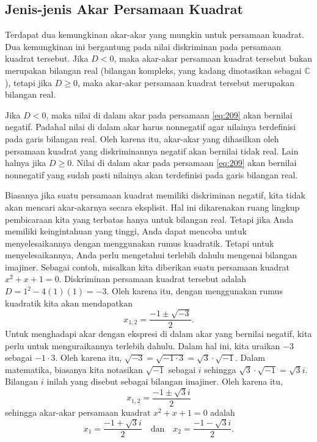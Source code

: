 \subsection{Jenis-jenis Akar Persamaan Kuadrat}

	Terdapat dua kemungkinan akar-akar yang mungkin untuk persamaan kuadrat. Dua kemungkinan ini bergantung pada nilai diskriminan pada persamaan kuadrat tersebut. Jika $ D < 0 $, maka akar-akar persamaan kuadrat tersebut bukan merupakan bilangan real (bilangan kompleks, yang kadang dinotasikan sebagai $ \mathbb{C} $), tetapi jika $ D \geq 0 $, maka akar-akar persamaan kuadrat tersebut merupakan bilangan real.
	
	\par Jika $ D < 0 $, maka nilai di dalam akar pada persamaan \ref{eq:209} akan bernilai negatif. Padahal nilai di dalam akar harus nonnegatif agar nilainya terdefinisi pada garis bilangan real. Oleh karena itu, akar-akar yang dihasilkan oleh persamaan kuadrat yang diskriminannya negatif akan bernilai tidak real. Lain halnya jika $ D \geq 0 $. Nilai di dalam akar pada persamaan \ref{eq:209} akan bernilai nonnegatif yang sudah pasti nilainya akan terdefinisi pada garis bilangan real.
	
	\par Biasanya jika suatu persamaan kuadrat memiliki diskriminan negatif, kita tidak akan mencari akar-akarnya secara eksplisit. Hal ini dikarenakan ruang lingkup pembicaraan kita yang terbatas hanya untuk bilangan real. Tetapi jika Anda memiliki keingintahuan yang tinggi, Anda dapat mencoba untuk menyelesaikannya dengan menggunakan rumus kuadratik. Tetapi untuk menyelesaikannya, Anda perlu mengetahui terlebih dahulu mengenai bilangan imajiner. Sebagai contoh, misalkan kita diberikan suatu persamaan kuadrat $ x^{2} + x + 1 = 0 $. Diskriminan persamaan kuadrat tersebut adalah $ D = 1^{2} - 4\left(1\right)\left(1\right) = -3 $. Oleh karena itu, dengan menggunakan rumus kuadratik kita akan mendapatkan
	\[ x_{1, 2} = \frac{-1 \pm \sqrt{-3}}{2}. \]
	Untuk menghadapi akar dengan ekspresi di dalam akar yang bernilai negatif, kita perlu untuk menguraikannya terlebih dahulu. Dalam hal ini, kita uraikan $ -3 $ sebagai $ -1 \cdot 3 $. Oleh karena itu, $ \sqrt{-3} = \sqrt{-1 \cdot 3} = \sqrt{3} \cdot \sqrt{-1} $. Dalam matematika, biasanya kita notasikan $ \sqrt{-1} $ sebagai $ i $ sehingga $ \sqrt{3} \cdot \sqrt{-1} = \sqrt{3}i $. Bilangan $ i $ inilah yang disebut sebagai bilangan imajiner. Oleh karena itu,
	\[ x_{1, 2} = \frac{-1 \pm \sqrt{3}i}{2} \]
	sehingga akar-akar persamaan kuadrat $ x^{2} + x + 1 = 0 $ adalah
	\[ x_{1} = \frac{-1 + \sqrt{3}i}{2} \quad \mbox{dan} \quad x_{2} = \frac{-1 - \sqrt{3}i}{2}. \]
	
